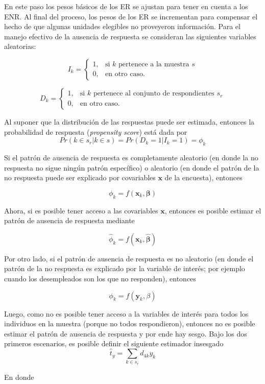 \documentclass[12pt,spanish,]{book}
\begin{document}
En este paso los pesos básicos de los ER se ajustan para tener en cuenta a los ENR. Al final del proceso, los pesos de los ER se incrementan para compensar el hecho de que algunas unidades elegibles no proveyeron información. Para el manejo efectivo de la ausencia de respuesta se consideran las siguientes variables aleatorias:

\[
I_k=
\begin{cases}
1,  &\text{si $k$ pertenece a la muestra $s$}\\
0,  &\text{en otro caso.}
\end{cases}
\]

\[
D_k=
\begin{cases}
1,  &\text{si $k$ pertenece al conjunto de respondientes $s_r$}\\
0,  &\text{en otro caso.}
\end{cases}
\]

Al suponer que la distribución de las respuestas puede ser estimada, entonces la probabilidad de respuesta (\emph{propensity score}) está dada por
\[
Pr(k\in s_r|k\in s)=Pr(D_k = 1|I_k = 1)=\phi_k 
\]

Si el patrón de ausencia de respuesta es completamente aleatorio (en donde la no respuesta no sigue ningún patrón específico) o aleatorio (en donde el patrón de la no respuesta puede ser explicado por covariables \(\mathbf{x}\) de la encuesta), entonces

\[
\phi_k = f(\mathbf{x}_k, \boldsymbol{\beta})
\]

Ahora, si es posible tener acceso a las covariables \(\mathbf{x}\), entonces es posible estimar el patrón de ausencia de respuesta mediante

\[
\hat{\phi}_k = f(\mathbf{x}_k, \hat{\boldsymbol{\beta}})
\]

Por otro lado, si el patrón de ausencia de respuesta es no aleatorio (en donde el patrón de la no respuesta es explicado por la variable de interés; por ejemplo cuando los desempleados son los que no responden), entonces

\[
\phi_k = f(\mathbf{y}_k, \beta)
\]

Luego, como no es posible tener acceso a la variables de interés para todos los individuos en la muestra (porque no todos respondieron), entonces no es posible estimar el patrón de ausencia de respuesta y por ende hay sesgo. Bajo los dos primeros escenarios, es posible definir el siguiente estimador insesgado
\[
\hat{t}_y=\sum_{k\in s_r}d_{4k}y_k
\]

En donde
\end{document}
